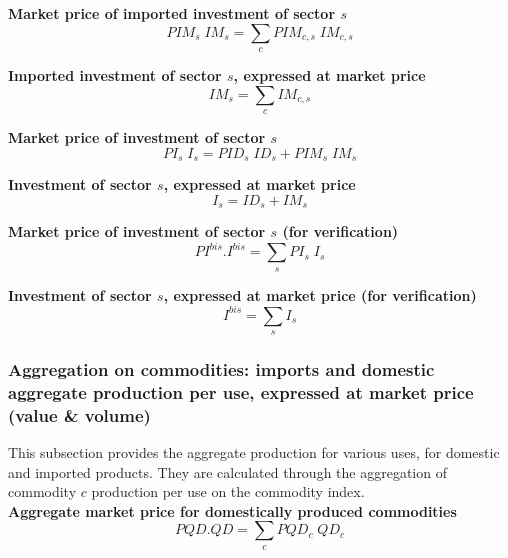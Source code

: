 \documentclass[12pt]{article}
\numberwithin{equation}{section}
\begin{document}
\noindent \textbf{Market price of imported investment of sector $s$} 
\begin{dmath}
PIM_{s} \; IM_{s} = \sum_{c} PIM_{c, s} \; IM_{c, s}
\label{SU.mdlPIM[s]}
\end{dmath}

\noindent \textbf{Imported investment of sector $s$, expressed at market price} 
\begin{dmath}
IM_{s} = \sum_{c} IM_{c, s}
\label{SU.mdlIM[s]}
\end{dmath}

\noindent \textbf{Market price of investment of sector $s$} 
\begin{dmath}
PI_{s} \; I_{s} = PID_{s} \; ID_{s} + PIM_{s} \; IM_{s}
\label{SU.mdlPI[s]}
\end{dmath}

\noindent \textbf{Investment of sector $s$, expressed at market price} 
\begin{dmath}
I_{s} = ID_{s} + IM_{s}
\label{SU.mdlI[s]}
\end{dmath}

\noindent \textbf{Market price of investment of sector $s$ (for verification)} 
\begin{dmath}
PI^{bis} . I^{bis} = \sum_{s} PI_{s} \; I_{s}
\label{SU.mdlPIbis}
\end{dmath}

\noindent \textbf{Investment of sector $s$, expressed at market price (for verification)} 
\begin{dmath}
I^{bis} = \sum_{s} I_{s}
\label{SU.mdlIbis}
\end{dmath}



\subsubsection{Aggregation on commodities: imports and domestic aggregate production per use, expressed at market price (value \& volume)}


This subsection provides the aggregate production for various uses, for domestic and imported products. They are calculated through the aggregation of commodity $c$ production per use on the commodity index. \\

\noindent \textbf{Aggregate market price for domestically produced commodities} 
\begin{dmath}
PQD . QD = \sum_{c} PQD_{c} \; QD_{c}
\label{SU.mdlPQD}
\end{dmath}
\end{document}
